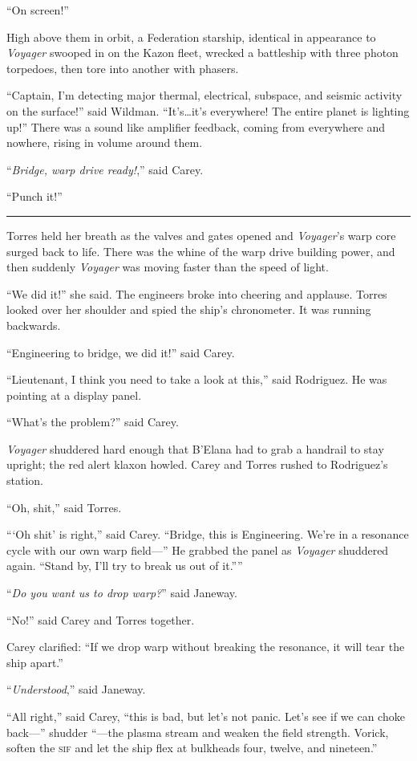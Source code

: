 \documentclass[twoside,letterpaper,12pt]{memoir}
\begin{document}
``On screen!''

High above them in orbit, a Federation starship, identical in appearance to \textit{Voyager} swooped in on the Kazon fleet, wrecked a battleship with three photon torpedoes, then tore into another with phasers.

``Captain, I'm detecting major thermal, electrical, subspace, and seismic activity on the surface!'' said Wildman. ``It's\ldots it's everywhere! The entire planet is lighting up!'' There was a sound like amplifier feedback, coming from everywhere and nowhere, rising in volume around them.

``\textit{Bridge, warp drive ready!},'' said Carey.

``Punch it!''

\fancybreak{\rule{3cm}{0.4 pt}}
Torres held her breath as the valves and gates opened and \textit{Voyager}'s warp core surged back to life. There was the whine of the warp drive building power, and then suddenly \textit{Voyager} was moving faster than the speed of light.

``We did it!'' she said. The engineers broke into cheering and applause. Torres looked over her shoulder and spied the ship's chronometer. It was running backwards.

``Engineering to bridge, we did it!'' said Carey.

``Lieutenant, I think you need to take a look at this,'' said Rodriguez. He was pointing at a display panel.

``What's the problem?'' said Carey.

\textit{Voyager} shuddered hard enough that B'Elana had to grab a handrail to stay upright; the red alert klaxon howled. Carey and Torres rushed to Rodriguez's station.

``Oh, shit,'' said Torres.

```Oh shit' is right,'' said Carey. ``Bridge, this is Engineering. We're in a resonance cycle with our own warp field---'' He grabbed the panel as \textit{Voyager} shuddered again. ``Stand by, I'll try to break us out of it.''''

``\textit{Do you want us to drop warp?}'' said Janeway.

``No!'' said Carey and Torres together.

Carey clarified: ``If we drop warp without breaking the resonance, it will tear the ship apart.''

``\textit{Understood},'' said Janeway.

``All right,'' said Carey, ``this is bad, but let's not panic. Let's see if we can choke back---'' shudder ``---the plasma stream and weaken the field strength. Vorick, soften the \textsc{sif} and let the ship flex at bulkheads four, twelve, and nineteen.''
\end{document}
